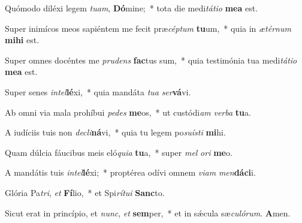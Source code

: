 \item Quómodo diléxi legem \textit{tuam}, \textbf{Dó}mine;~* tota die medi\textit{tátio} \textbf{me}\textbf{a} est.

\item Super inimícos meos sapiéntem me fecit præ\textit{céptum} \textbf{tu}um,~* quia in \textit{ætérnum} \textbf{mi}\textbf{hi} est.

\item Super omnes docéntes me \textit{prudens} \textbf{fac}tus sum,~* quia testimónia tua medi\textit{tátio} \textbf{me}\textbf{a} est.

\item Super senes \textit{intel}\textbf{lé}xi,~* quia mandáta \textit{tua} \textit{ser}\textbf{vá}vi.

\item Ab omni via mala prohíbui \textit{pedes} \textbf{me}os,~* ut custódi\textit{am} \textit{verba} \textbf{tu}a.

\item A iudíciis tuis non \textit{decli}\textbf{ná}vi,~* quia tu legem po\textit{suísti} \textbf{mi}hi.

\item Quam dúlcia fáucibus meis eló\textit{quia} \textbf{tu}a,~* super \textit{mel} \textit{ori} \textbf{me}o.

\item A mandátis tuis \textit{intel}\textbf{lé}xi;~* proptérea odívi omnem \textit{viam} \textit{men}\textbf{dá}\textbf{ci}i.

\item Glória Pa\textit{tri}, \textit{et} \textbf{Fí}lio,~* et Spi\textit{rítui} \textbf{Sanc}to.

\item Sicut erat in princípio, et \textit{nunc}, \textit{et} \textbf{sem}per,~* et in sǽcula sæ\textit{culórum}. \textbf{A}men.
